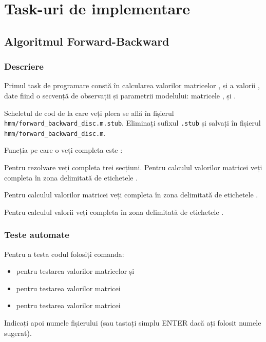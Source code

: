 \documentclass[12pt]{article}
\begin{document}
\section{Task-uri de implementare}
\label{sec:tasks}

\subsection{Algoritmul Forward-Backward}
\label{sec:fb}

\subsubsection{Descriere}
\label{sec:descr-fb}

Primul task de programare constă în calcularea valorilor matricelor
,  și a valorii , date fiind o
secvență de observații  și parametrii modelului: matricele
,  și .

Scheletul de cod de la care veți pleca se află în fișierul\\
\texttt{hmm/forward\_backward\_disc.m.stub}. Eliminați sufixul
\texttt{.stub} și salvați în fișierul
\texttt{hmm/forward\_backward\_disc.m}.

Funcția pe care o veți completa este :



Pentru rezolvare veți completa trei secțiuni.
 Pentru calculul
valorilor matricei  veți completa în zona delimitată de
etichetele .

 Pentru calculul
valorilor matricei  veți completa în zona delimitată de
etichetele .

 Pentru calculul
valorii  veți completa în zona delimitată de
etichetele .



\subsubsection{Teste automate}
\label{sec:tester-fb}

Pentru a testa codul folosiți comanda:
\begin{itemize}
\item {} pentru testarea valorilor
  matricelor  și 
\item {} pentru testarea valorilor
  matricei 
\item {} pentru testarea valorilor
  matricei 
\end{itemize}
Indicați apoi numele fișierului (sau tastați simplu ENTER dacă ați
folosit numele sugerat).
\end{document}
